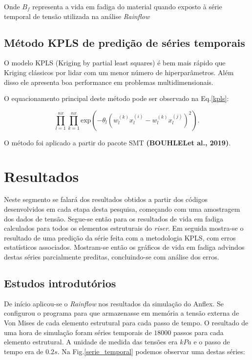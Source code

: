 Onde $B_f$ representa a vida em fadiga do material quando exposto à série  temporal de tensão utilizada na análise \emph{Rainflow}

\subsection{Método KPLS de predição de séries temporais}

O modelo KPLS (Kriging by partial least squares) é bem mais rápido que Kriging clássicos por lidar com um menor número de hiperparâmetros. Além disso ele apresenta boa performance em problemas multidimensionais. 

O equacionamento principal deste método pode ser observado na Eq.\ref{kpls}:
    
\begin{equation}\label{kpls}
    \prod^{nx}_{l=1} \prod^{nx}_{k=1} \text{exp} \left( -\theta_l(w_l^{(k)} x_l^{(i)} - w_l^{(k)} x_l^{(j)} )^2\right).
\end{equation}

O método foi aplicado a partir do pacote SMT \textbf{(BOUHLELet al., 2019)}.

\section{Resultados}

Neste segmento se falará dos resultados obtidos a partir dos códigos desenvolvidos em cada etapa desta pesquisa, começando com uma amostragem dos dados de tensão. Segue-se então para os resultados de vida em fadiga calculados para todos os elementos estruturais do \emph{riser}. Em seguida mostra-se o resultado de uma predição da série feita com a metodologia KPLS, com erros estatísticos associados. Mostram-se então os gráficos de vida em fadiga advindos destas séries parcialmente preditas, concluindo-se com análise dos erros.

\subsection{Estudos introdutórios}

De início aplicou-se o \emph{Rainflow} nos resultados da simulação do Anflex. Se configurou o programa para que armazenasse em memória a tensão externa de Von Mises de cada elemento estrutural para cada passo de tempo. O resultado de uma hora de simulação foram séries temporais de $18000$ passos para cada elemento estrutural. A unidade de medida das tensões era $kPa$ e o passo de tempo era de $0.2 s$. Na Fig.\ref{serie_temporal} podemos observar uma destas séries:

